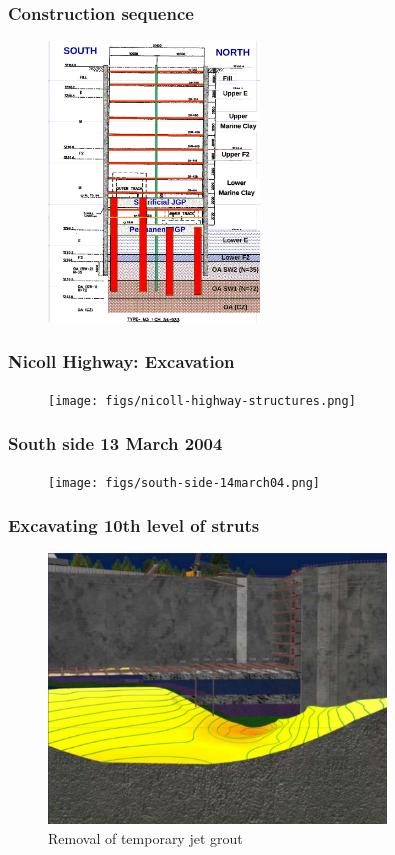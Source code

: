 \documentclass[handout]{beamer}
\begin{document}
\begin{frame}
\frametitle{Construction sequence}
\begin{figure}[ht]
	\centering
	\includegraphics[width=0.5\textwidth]{figs/excavation-stages.png}
\end{figure}
\end{frame}

\begin{frame}
\frametitle{Nicoll Highway: Excavation}
\begin{figure}[ht]
	\centering
	\texttt{[image: figs/nicoll-highway-structures.png]}
\end{figure}
\end{frame}

\begin{frame}
\frametitle{South side 13 March 2004}
\begin{figure}[ht]
	\centering
	\texttt{[image: figs/south-side-14march04.png]}
\end{figure}
\end{frame}

\begin{frame}
\frametitle{Excavating 10th level of struts}
\begin{figure}[ht]
	\centering
	\includegraphics[width=0.8\textwidth]{figs/excavation-10-struts-jgp.png}
	\caption*{Removal of temporary jet grout}
\end{figure}
\end{frame}
\end{document}
